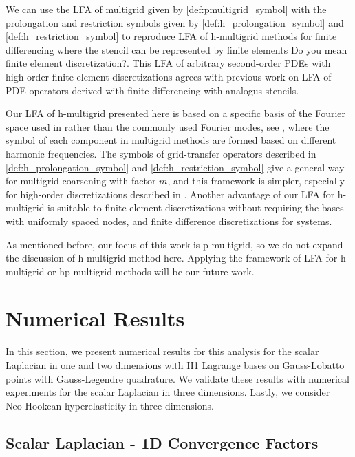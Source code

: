 \documentclass[review]{siamart190516}
\newcommand{\yh}[1]{{\color{red}#1}}
\begin{document}
We can use the LFA of multigrid given by  \cref{def:pmultigrid_symbol} with the prolongation and restriction symbols given by \cref{def:h_prolongation_symbol} and  \cref{def:h_restriction_symbol} to reproduce LFA of h-multigrid methods for finite differencing where the stencil can be represented by finite elements \yh{Do you mean finite element discretization?}.
This LFA of arbitrary second-order PDEs with high-order finite element discretizations agrees with previous work on LFA of PDE operators derived with finite differencing with analogus stencils.


Our LFA of h-multigrid presented here is based on a specific basis of the Fourier space used in \cite{kumar2019local} rather than the commonly used Fourier modes, see \cite{MR1807961,wienands2004practical}, where the symbol of each component in multigrid methods are formed based on different harmonic frequencies. The symbols of grid-transfer operators described in \cref{def:h_prolongation_symbol} and  \cref{def:h_restriction_symbol} give a general way for multigrid coarsening with factor $m$, and this framework is simpler, especially for high-order discretizations described in \cite{he2020two}. Another advantage of our LFA for h-multigrid is suitable to  finite element discretizations without requiring the bases with uniformly spaced nodes, and finite difference discretizations for systems.

As mentioned before, our focus of this work is p-multigrid,  so we do not expand the discussion of h-multigrid method here.  Applying the framework of LFA for h-multigrid or hp-multigrid methods will be our future work.
  
\section{Numerical Results}\label{sec:results}

In this section, we present numerical results for this analysis for the scalar Laplacian in one and two dimensions with H1 Lagrange bases on Gauss-Lobatto points with Gauss-Legendre quadrature.
We validate these results with numerical experiments for the scalar Laplacian in three dimensions.
Lastly, we consider Neo-Hookean hyperelasticity in three dimensions.

\subsection{Scalar Laplacian - 1D Convergence Factors}\label{sec:1dresults}
\end{document}
